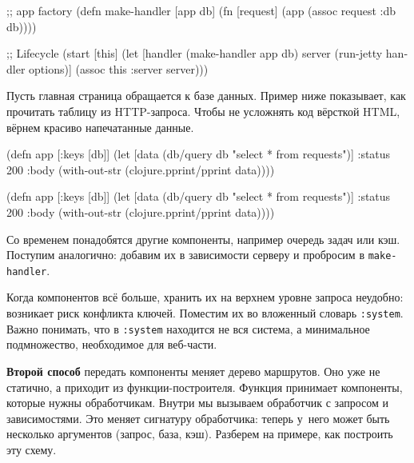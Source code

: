 \else

\begin{english}
  \begin{clojure}
;; app factory
(defn make-handler [app db]
  (fn [request]
    (app (assoc request :db db))))

;; Lifecycle
(start [this]
  (let [handler (make-handler app db)
        server (run-jetty handler options)]
    (assoc this :server server)))
  \end{clojure}
\end{english}

\fi

Пусть главная страница обращается к базе данных. Пример ниже показывает, как
прочитать таблицу из HTTP-запроса. Чтобы не усложнять код вёрсткой HTML, вёрнем
красиво напечатанные данные.

\ifx\DEVICETYPE\MOBILE

\begin{english}
  \begin{clojure}
(defn app [{:keys [db]}]
  (let [data (db/query db
               "select * from requests")]
    {:status 200
     :body (with-out-str
             (clojure.pprint/pprint
               data))}))
  \end{clojure}
\end{english}

\else

\begin{english}
  \begin{clojure}
(defn app [{:keys [db]}]
  (let [data (db/query db "select * from requests")]
    {:status 200
     :body (with-out-str
             (clojure.pprint/pprint data))}))
  \end{clojure}
\end{english}

\fi

Со временем понадобятся другие компоненты, например очередь задач или
кэш. Поступим аналогично: добавим их в зависимости серверу и пробросим в
\verb|make-handler|.


Когда компонентов всё больше, хранить их на верхнем уровне запроса неудобно:
возникает риск конфликта ключей. Поместим их во вложенный словарь
\verb|:system|. Важно понимать, что в \verb|:system| находится не вся система, а
минимальное подмножество, необходимое для веб-части.

\textbf{Второй способ} передать компоненты меняет дерево маршрутов. Оно уже не
статично, а приходит из функции-построителя. Функция принимает компоненты,
которые нужны обработчикам. Внутри мы вызываем обработчик с запросом и
зависимостями. Это меняет сигнатуру обработчика: теперь у~него может быть
несколько аргументов (запрос, база, кэш). Разберем на примере, как построить эту
схему.

